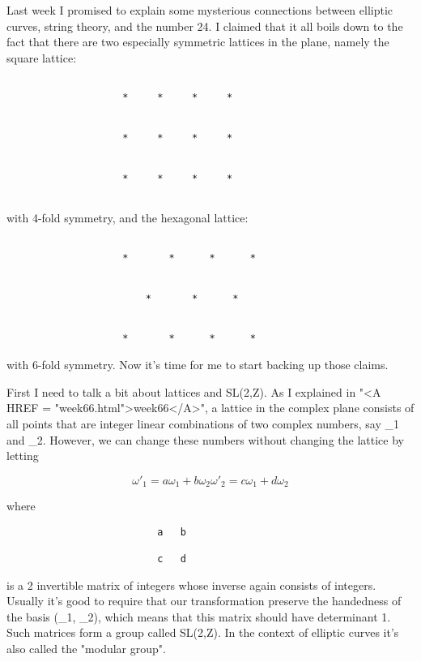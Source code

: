 

Last week I promised to explain some mysterious connections between
elliptic curves, string theory, and the number 24.  I claimed that
it all boils down to the fact that there are two especially symmetric
lattices in the plane, namely the square lattice:


\begin{verbatim}

                    *     *     *     *


                    *     *     *     *


                    *     *     *     *
         
\end{verbatim}
    
with 4-fold symmetry, and the hexagonal lattice:


\begin{verbatim}

                    *       *      *      *


                        *       *      *                


                    *       *      *      *

\end{verbatim}
    

with 6-fold symmetry.  Now it's time for me to start backing up those
claims.  

First I need to talk a bit about lattices and SL(2,Z).  As I explained
in "<A HREF = "week66.html">week66</A>", a lattice in the complex plane consists of all points that
are integer linear combinations of two complex numbers, 
say \omega _{1} and
\omega _{2}.  However, we can change these numbers without 
changing the lattice by letting

$$
                 \omega '_{1} = a \omega _{1} + b \omega _{2}

                 \omega '_{2} = c \omega _{1} + d \omega _{2}

$$
    
where 
\begin{verbatim}
                          a   b 

                          c   d
\end{verbatim}
    
is a 2 invertible matrix of integers whose inverse again consists of
integers.  Usually it's good to require
that our transformation preserve the handedness of the basis (\omega _{1},
\omega _{2}), which means that this matrix should have determinant 1.
Such matrices form a group called SL(2,Z).  In the context of elliptic
curves it's also called the "modular group".

